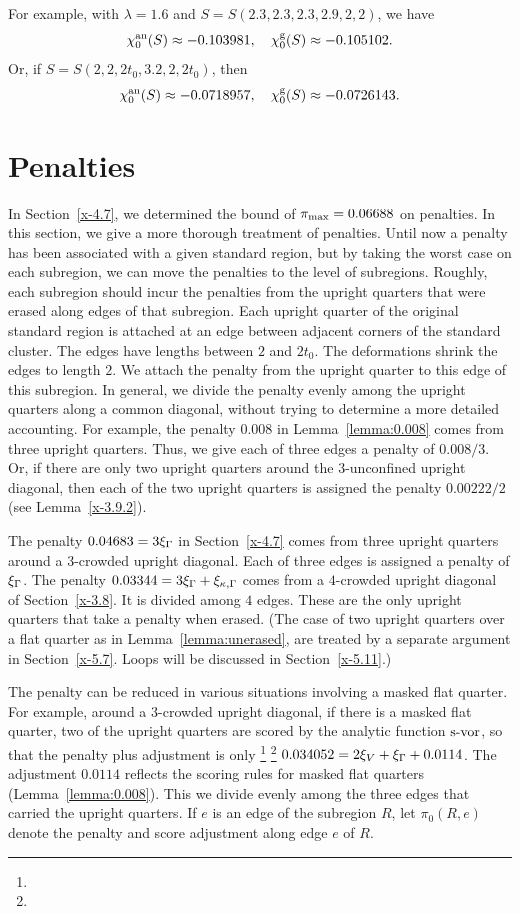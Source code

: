 For example, with $\lambda=1.6$ and $S = S(2.3,2.3,2.3,2.9,2,2)$, we
have
    $$\chi_0^{\operatorname{an}}(S)\approx -0.103981, \quad\chi_0^{\operatorname{g}}(S)\approx -0.105102.$$
Or, if $S=S(2,2,2t_0,3.2,2,2t_0)$, then
    $$\chi_0^{\operatorname{an}}(S)\approx -0.0718957, \quad
    \chi_0^{\operatorname{g}}(S)\approx -0.0726143.$$


\section{Penalties}
    \label{sec:penalty1}

In Section~\ref{x-4.7}, we determined the bound of
$\pi_{\max}=0.06688$ on penalties. In this section, we give a more
thorough treatment of penalties. Until now a penalty has been
associated with a given standard region, but by taking the worst
case on each subregion, we can move the penalties to the level of
subregions.   Roughly, each subregion should incur the penalties
from the upright quarters that were erased along edges of that
subregion.  Each upright quarter of the original standard region
is attached at an edge between adjacent corners of the standard
cluster. The edges have lengths between $2$ and $2t_0$.  The
deformations shrink the edges to length $2$.  We attach the
penalty from the upright quarter to this edge of this subregion.
In general, we divide the penalty evenly among the upright
quarters along a common diagonal, without trying to determine a
more detailed accounting. For example, the penalty $0.008$ in
Lemma~\ref{lemma:0.008} comes from three upright quarters.  Thus,
we give each of three edges a penalty of $0.008/3$. Or, if there
are only two upright quarters around the $3$-unconfined upright
diagonal, then each of the two upright quarters is assigned the
penalty $0.00222/2$ (see Lemma~\ref{x-3.9.2}).

The penalty $0.04683 = 3\xi_\Gamma$ in Section~\ref{x-4.7} comes from
three upright quarters around a $3$-crowded upright diagonal. Each
of three edges is assigned a penalty of $\xi_\Gamma$.  The penalty
$0.03344=3\xi_\Gamma+\xi_{\kappa,\Gamma}$ comes from a $4$-crowded upright diagonal of
Section~\ref{x-3.8}. It is divided among $4$ edges. These are the
only upright quarters that take a penalty when erased. (The case
of two upright quarters over a flat quarter as in
Lemma~\ref{lemma:unerased}, are treated by a separate argument in
Section~\ref{x-5.7}. Loops will be discussed in
Section~\ref{x-5.11}.)

The penalty can be reduced in various situations involving a
masked flat quarter.  For example, around a $3$-crowded upright
diagonal, if there is a masked flat quarter, two of the upright
quarters are scored by the analytic  function $\operatorname{s-vor}$, so that the
penalty plus adjustment is only%
\footnote{} %
\footnote{} %
 $0.034052=2\xi_V+\xi_\Gamma+0.0114$.
The adjustment $0.0114$ reflects the scoring
rules for masked flat quarters (Lemma~\ref{lemma:0.008}).  This we
divide evenly among the three edges that carried the upright
quarters. If $e$ is an edge of the subregion $R$, let $\pi_0(R,e)$
denote the penalty and score adjustment along edge $e$ of $R$.

